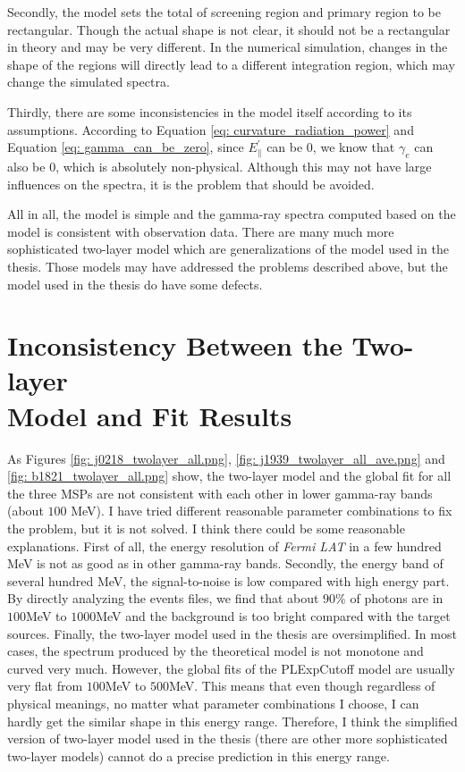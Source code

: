 \documentclass[12pt]{report}
\begin{document}
    Secondly, the model sets the total of screening region and primary region to be 
    rectangular. Though the actual shape is not clear, it should not be a 
    rectangular in theory and may be very different. In the numerical simulation, changes 
    in the shape of the regions will directly lead to a different integration region, 
    which may change the simulated spectra.
  
    Thirdly, there are some inconsistencies in the model itself according to its 
    assumptions. According to Equation \ref{eq: curvature_radiation_power} and Equation 
    \ref{eq: gamma_can_be_zero}, since $E_{\parallel}^{\prime}$ can be $0$, we know that 
    $\gamma_{e}$ can also be $0$, which is absolutely non-physical. Although this may not 
    have large influences on the spectra, it is the problem that should be avoided.

    All in all, the model is simple and the gamma-ray spectra computed based on the model 
    is consistent with observation data. There are many much more sophisticated 
    two-layer model which are generalizations of the model used in the thesis. Those models 
    may have addressed the problems described above, but the model used in the thesis 
    do have some defects.  
      
  \section{Inconsistency Between the Two-layer \\ Model and Fit Results}
    As Figures \ref{fig: j0218_twolayer_all.png}, \ref{fig: j1939_twolayer_all_ave.png} and 
    \ref{fig: b1821_twolayer_all.png} show, the two-layer model and the global fit for all 
    the three MSPs are not consistent with each other in lower gamma-ray bands (about $100$ 
    MeV). I have tried different reasonable parameter combinations to fix the problem, but 
    it is not solved. I think there could be some reasonable explanations. First of all, 
    the energy resolution of \textit{Fermi LAT} in a few hundred MeV is not as good as in 
    other gamma-ray bands. Secondly, the energy band of several hundred MeV, the signal-to-noise 
    is low compared with high energy part. By directly analyzing the events files, we find that 
    about $90\%$ of photons are in $100$MeV to $1000$MeV and the background is too bright 
    compared with the target sources. Finally, the two-layer model used in the thesis are 
    oversimplified. In most cases, the spectrum produced by the theoretical model is not monotone and 
    curved very much. However, the global fits of the PLExpCutoff model are usually very 
    flat from $100$MeV to $500$MeV. This means that even though regardless of physical meanings,
    no matter what parameter combinations I choose, I can hardly get the similar shape in this 
    energy range. Therefore, I think the simplified version of two-layer model used in the 
    thesis (there are other more sophisticated two-layer models) cannot do a precise prediction 
    in this energy range. 
    
\end{document}
